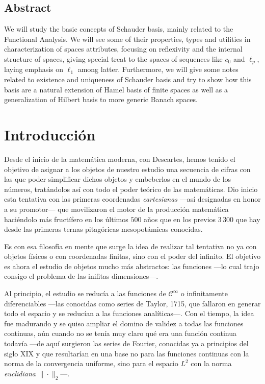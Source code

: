 	\vspace*{2cm}
	
	{\let\clearpage\relax\section*{Abstract}}
	
	We will study the basic concepts of Schauder basis, mainly related to the Functional Analysis. We will see some of their properties, types and utilities in characterization of spaces attributes, focusing on reflexivity and the internal structure of spaces, giving special treat to the spaces of sequences like $c_0$ and $\ell_p$, laying emphasis on $\ell_1$ among latter. Furthermore, we will give some notes related to existence and uniqueness of Schauder basis and try to show how this basis are a natural extension of Hamel basis of finite spaces as well as a generalization  of Hilbert basis to more generic Banach spaces.
	
	\clearpage
	
	
	{\renewcommand{\chaptertitlesize}{25pt}
	\chapter*{Introducción}}
	
	
	Desde el inicio de la matemática moderna, con Descartes, hemos tenido el objetivo de asignar a los objetos de nuestro estudio una secuencia de cifras con las que poder simplificar dichos objetos y embeberlos en el mundo de los números, tratándolos así con todo el poder teórico de las matemáticas. Dio inicio esta tentativa con las primeras coordenadas \textit{cartesianas} ---así designadas en honor a su promotor--- que movilizaron el motor de la producción matemática haciéndolo más fructífero en los últimos $500$ años que en los previos $3\,300$ que hay desde las primeras ternas pitagóricas mesopotámicas conocidas.
	
	Es con esa filosofía en mente que surge la idea de realizar tal tentativa no ya con objetos físicos o con coordenadas finitas, sino con el poder del infinito. El objetivo es ahora el estudio de objetos mucho más abstractos: las funciones ---lo cual trajo consigo el problema de las inifitas dimensiones---.
	
	Al principio, el estudio se reducía a las funciones de $\mathcal{C}^\infty$ o infinitamente diferenciables ---las conocidas como series de Taylor, 1715, que fallaron en generar todo el espacio y se reducían a las funciones analíticas---. Con el tiempo, la idea fue madurando y se quiso ampliar el domino de validez a todas las funciones continuas, aún cuando no se tenía muy claro qué era una función continua todavía ---de aquí surgieron las series de Fourier, conocidas ya a principios del siglo XIX y que resultarían en una base no para las funciones continuas con la norma de la convergencia uniforme, sino para el espacio $L^2$ con la norma \emph{euclidiana} $\|\!\cdot\!\|_2$---. 
	
